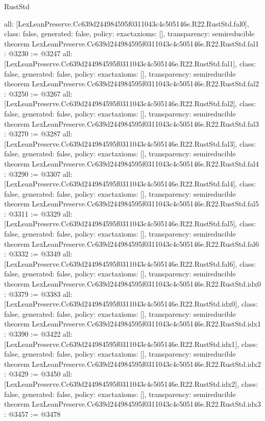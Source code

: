 \begin{lexlean}{RustStd}
\begin{coremodule}
{  all: [LexLeanPreserve.Cc639d244984595f0311043c4c505146e.R22.RustStd.fal0],
  class: false,
  generated: false,
  policy: exact{axioms: []},
  transparency: semireducible
}
theorem LexLeanPreserve.Cc639d244984595f0311043c4c505146e.R22.RustStd.fal1 : @3230 := @3247 {
  all: [LexLeanPreserve.Cc639d244984595f0311043c4c505146e.R22.RustStd.fal1],
  class: false,
  generated: false,
  policy: exact{axioms: []},
  transparency: semireducible
}
theorem LexLeanPreserve.Cc639d244984595f0311043c4c505146e.R22.RustStd.fal2 : @3250 := @3267 {
  all: [LexLeanPreserve.Cc639d244984595f0311043c4c505146e.R22.RustStd.fal2],
  class: false,
  generated: false,
  policy: exact{axioms: []},
  transparency: semireducible
}
theorem LexLeanPreserve.Cc639d244984595f0311043c4c505146e.R22.RustStd.fal3 : @3270 := @3287 {
  all: [LexLeanPreserve.Cc639d244984595f0311043c4c505146e.R22.RustStd.fal3],
  class: false,
  generated: false,
  policy: exact{axioms: []},
  transparency: semireducible
}
theorem LexLeanPreserve.Cc639d244984595f0311043c4c505146e.R22.RustStd.fal4 : @3290 := @3307 {
  all: [LexLeanPreserve.Cc639d244984595f0311043c4c505146e.R22.RustStd.fal4],
  class: false,
  generated: false,
  policy: exact{axioms: []},
  transparency: semireducible
}
theorem LexLeanPreserve.Cc639d244984595f0311043c4c505146e.R22.RustStd.fal5 : @3311 := @3329 {
  all: [LexLeanPreserve.Cc639d244984595f0311043c4c505146e.R22.RustStd.fal5],
  class: false,
  generated: false,
  policy: exact{axioms: []},
  transparency: semireducible
}
theorem LexLeanPreserve.Cc639d244984595f0311043c4c505146e.R22.RustStd.fal6 : @3332 := @3349 {
  all: [LexLeanPreserve.Cc639d244984595f0311043c4c505146e.R22.RustStd.fal6],
  class: false,
  generated: false,
  policy: exact{axioms: []},
  transparency: semireducible
}
theorem LexLeanPreserve.Cc639d244984595f0311043c4c505146e.R22.RustStd.idx0 : @3379 := @3383 {
  all: [LexLeanPreserve.Cc639d244984595f0311043c4c505146e.R22.RustStd.idx0],
  class: false,
  generated: false,
  policy: exact{axioms: []},
  transparency: semireducible
}
theorem LexLeanPreserve.Cc639d244984595f0311043c4c505146e.R22.RustStd.idx1 : @3390 := @3422 {
  all: [LexLeanPreserve.Cc639d244984595f0311043c4c505146e.R22.RustStd.idx1],
  class: false,
  generated: false,
  policy: exact{axioms: []},
  transparency: semireducible
}
theorem LexLeanPreserve.Cc639d244984595f0311043c4c505146e.R22.RustStd.idx2 : @3429 := @3450 {
  all: [LexLeanPreserve.Cc639d244984595f0311043c4c505146e.R22.RustStd.idx2],
  class: false,
  generated: false,
  policy: exact{axioms: []},
  transparency: semireducible
}
theorem LexLeanPreserve.Cc639d244984595f0311043c4c505146e.R22.RustStd.idx3 : @3457 := @3478 {
}
\end{coremodule}
\end{lexlean}
